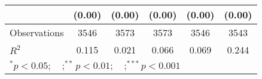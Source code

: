 \begin{table}[htbp]
\begin{tabular}{l*{5}{c}}
                    &      (0.00)         &      (0.00)         &      (0.00)         &      (0.00)         &      (0.00)         \\
\midrule
Observations        &        3546         &        3573         &        3573         &        3546         &        3543         \\
\(R^{2}\)           &       0.115         &       0.021         &       0.066         &       0.069         &       0.244         \\
\bottomrule
\multicolumn{6}{l}{\footnotesize $^{*}p<0.05; \quad ; ^{**} p<0.01; \quad ; ^{***}p<0.001$}\\
\end{tabular}
\end{table}
